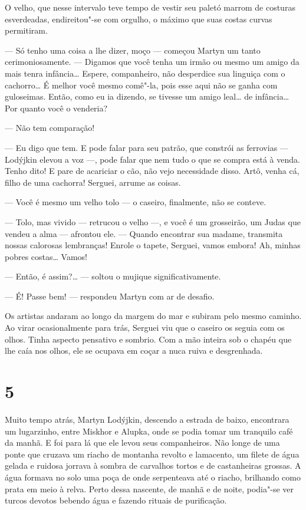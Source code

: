O velho, que nesse intervalo teve tempo de vestir seu paletó marrom de
costuras esverdeadas, endireitou"-se com orgulho, o máximo que suas
costas curvas permitiram.

--- Só tenho uma coisa a lhe dizer, moço --- começou Martyn um tanto
cerimoniosamente. --- Digamos que você tenha um irmão ou mesmo um amigo
da mais tenra infância\ldots{} Espere, companheiro, não desperdice sua
linguiça com o cachorro\ldots{} É melhor você mesmo comê"-la, pois esse aqui
não se ganha com guloseimas. Então, como eu ia dizendo, se tivesse um
amigo leal\ldots{} de infância\ldots{} Por quanto você o venderia?

--- Não tem comparação!

--- Eu digo que tem. E pode falar para seu patrão, que constrói as
ferrovias --- Lodýjkin elevou a voz ---, pode falar que nem tudo o que
se compra está à venda. Tenho dito! E pare de acariciar o cão, não vejo
necessidade disso. Artô, venha cá, filho de uma cachorra! Serguei,
arrume as coisas.

--- Você é mesmo um velho tolo --- o caseiro, finalmente, não se
conteve.

--- Tolo, mas vivido --- retrucou o velho ---, e você é um grosseirão,
um Judas que vendeu a alma --- afrontou ele. --- Quando encontrar sua
madame, transmita nossas calorosas lembranças! Enrole o tapete, Serguei,
vamos embora! Ah, minhas pobres costas\ldots{} Vamos!

--- Então, é assim?\ldots{} --- soltou o mujique significativamente.

--- É! Passe bem! --- respondeu Martyn com ar de desafio.

Os artistas andaram ao longo da margem do mar e subiram pelo mesmo
caminho. Ao virar ocasionalmente para trás, Serguei viu que o caseiro os
seguia com os olhos. Tinha aspecto pensativo e sombrio. Com a mão
inteira sob o chapéu que lhe caía nos olhos, ele se ocupava em coçar a
nuca ruiva e desgrenhada.

\section{5}

Muito tempo atrás, Martyn Lodýjkin, descendo a estrada de baixo,
encontrara um lugarzinho, entre Miskhor e Alupka, onde se podia tomar um
tranquilo café da manhã. E foi para lá que ele levou seus companheiros.
Não longe de uma ponte que cruzava um riacho de montanha revolto e
lamacento, um filete de água gelada e ruidosa jorrava à sombra de
carvalhos tortos e de castanheiras grossas. A água formava no solo uma
poça de onde serpenteava até o riacho, brilhando como prata em meio à
relva. Perto dessa nascente, de manhã e de noite, podia"-se ver turcos
devotos bebendo água e fazendo rituais de purificação.

